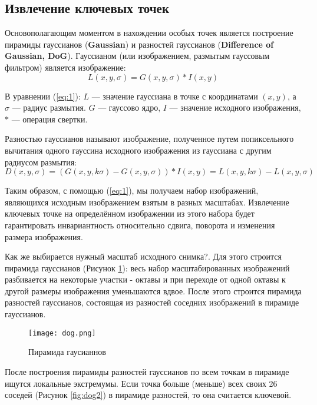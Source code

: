 \subsection{Извлечение ключевых точек}

Основополагающим моментом в нахождении особых точек является построение пирамиды гауссианов (\textbf{Gaussian}) и разностей гауссианов (\textbf{Difference of Gaussian, DoG}). Гауссианом (или изображением, размытым гауссовым фильтром) является изображение:
\begin{equation} \label{eq:1}
    L(x,y,\sigma) = G(x,y,\sigma) * I(x,y)
\end{equation} 

В уравнении (\ref{eq:1}): $L$ — значение гауссиана в точке с координатами $(x,y)$, а $\sigma$ — радиус размытия. $G$ — гауссово ядро, $I$ — значение исходного изображения, $*$ — операция свертки.

Разностью гауссианов называют изображение, полученное путем попиксельного вычитания одного гауссина исходного изображения из гауссиана с другим радиусом размытия:
\begin{equation} \label{eq:2}
    D(x,y,\sigma) = (G(x,y,k\sigma)-G(x,y,\sigma)) * I(x,y) = L(x,y,k\sigma) - L(x,y,\sigma)
\end{equation}

Таким образом, с помощью (\ref{eq:1}), мы получаем набор изображений, являющихся исходным изображением взятым в разных масштабах. Извлечение ключевых точке на определённом изображении из этого набора будет гарантировать инвариантность относительно сдвига, поворота и изменения размера изображения.

Как же выбирается нужный масштаб исходного снимка?. Для этого строится пирамида гауссианов (Рисунок \ref{fig:dog1}): весь набор масштабированных изображений разбивается на некоторые участки - октавы и при переходе от одной октавы к другой размеры изображения уменьшаются вдвое. После этого строится пирамида разностей гауссианов, состоящая из разностей соседних изображений в пирамиде гауссианов.

\begin{figure}[h]
    \centering
    \texttt{[image: dog.png]}
    \caption{Пирамида гаусианнов}
    \label{fig:dog1}
\end{figure}

После построения пирамиды разностей гауссианов по всем точкам в пирамиде ищутся локальные экстремумы. Если точка больше (меньше) всех своих 26 соседей (Рисунок \ref{fig:dog2}) в пирамиде разностей, то она считается ключевой.

